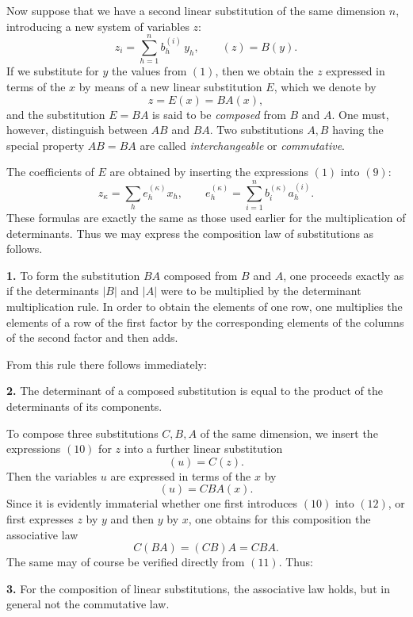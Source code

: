 \documentclass[11pt]{article}
\begin{document}
Now suppose that we have a second linear substitution of the same dimension \(n\), introducing a new system of variables \(z\):
\[
z_i=\sum_{h=1}^n b^{(i)}_h\,y_h,\qquad (z)=B(y).
\tag{9}
\]
If we substitute for \(y\) the values from \((1)\), then we obtain the \(z\) expressed in terms of the \(x\) by means of a new linear substitution \(E\), which we denote by
\[
z=E(x)=BA(x),
\tag{10}
\]
and the substitution \(E=BA\) is said to be \emph{composed} from \(B\) and \(A\). One must, however, distinguish between \(AB\) and \(BA\). Two substitutions \(A,B\) having the special property \(AB=BA\) are called \emph{interchangeable} or \emph{commutative}.

The coefficients of \(E\) are obtained by inserting the expressions \((1)\) into \((9)\):
\[
z_\kappa=\sum_h e^{(\kappa)}_h x_h,\qquad
e^{(\kappa)}_h=\sum_{i=1}^n b^{(\kappa)}_i a^{(i)}_h.
\tag{11}
\]
These formulas are exactly the same as those used earlier for the multiplication of determinants. Thus we may express the composition law of substitutions as follows.

\medskip
\noindent\textbf{1.}
To form the substitution \(BA\) composed from \(B\) and \(A\), one proceeds exactly as if the determinants \(|B|\) and \(|A|\) were to be multiplied by the determinant multiplication rule. In order to obtain the elements of one row, one multiplies the elements of a row of the first factor by the corresponding elements of the columns of the second factor and then adds.

\medskip
From this rule there follows immediately:

\medskip
\noindent\textbf{2.}
The determinant of a composed substitution is equal to the product of the determinants of its components.

\medskip
To compose three substitutions \(C,B,A\) of the same dimension, we insert the expressions \((10)\) for \(z\) into a further linear substitution
\[
(u)=C(z).
\tag{12}
\]
Then the variables \(u\) are expressed in terms of the \(x\) by
\[
(u)=CBA(x).
\tag{13}
\]
Since it is evidently immaterial whether one first introduces \((10)\) into \((12)\), or first expresses \(z\) by \(y\) and then \(y\) by \(x\), one obtains for this composition the associative law
\[
C(BA)=(CB)A=CBA.
\tag{14}
\]
The same may of course be verified directly from \((11)\). Thus:

\medskip
\noindent\textbf{3.}
For the composition of linear substitutions, the associative law holds, but in general not the commutative law.
\end{document}
